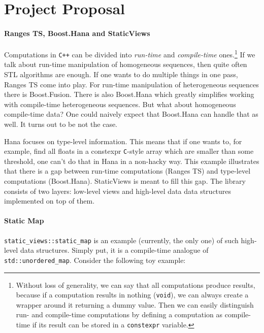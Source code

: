 \documentclass[a4paper,12pt]{article}
\begin{document}
\newpage
\section*{Project Proposal}
    \paragraph{Ranges TS, Boost.Hana and StaticViews} Computations in
    \texttt{C++} can be divided into \textit{run-time} and \textit{compile-time}
    ones.\footnote{%
        Without loss of generality, we can say that all computations produce
        results, because if a computation results in nothing (\texttt{void}), we
        can always create a wrapper around it returning a dummy value. Then we
        can easily distinguish run- and compile-time computations by defining a
        computation as compile-time if its result can be stored in a
        \texttt{constexpr} variable.%
    }
    If we talk about run-time manipulation of homogeneous sequences, then quite
    often STL algorithms\cite{stl-algorithms} are enough. If one wants to do
    multiple things in one pass, Ranges TS\cite{ranges-ts} come into play. For
    run-time manipulation of heterogeneous sequences there is
    Boost.Fusion\cite{boost-fusion}. There is also Boost.Hana\cite{boost-hana}
    which greatly simplifies working with compile-time heterogeneous sequences.
    But what about homogeneous compile-time data? One could naively expect that
    Boost.Hana can handle that as well. It turns out to be not the case.

    Hana focuses on type-level information. This means that if one wants to, for
    example, find all floats in a constexpr \texttt{C}-style array which are
    smaller than some threshold, one can't do that in Hana in a non-hacky way.
    This example illustrates that there is a gap between run-time computations
    (Ranges TS) and type-level computations (Boost.Hana). StaticViews is meant
    to fill this gap. The library consists of two layers: low-level views and
    high-level data data structures implemented on top of them.

    \paragraph{Static Map} \texttt{static\_views::static\_map} is an example
    (currently, the only one) of such high-level data structures. Simply put, it
    is a compile-time analogue of \texttt{std::unordered\_map}. Consider the
    following toy example:
\end{document}
